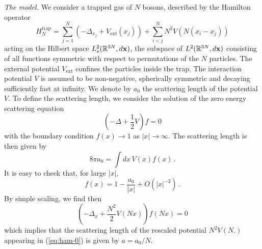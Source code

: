 \documentclass[11pt,a4paper]{article}
\newcommand{\bx}{{\bf x}}
\newcommand{\bR}{{\mathbb R}}
\begin{document}

\bigskip

{\it The model.} We consider a trapped gas of $N$ bosons, described by the Hamilton operator 
\begin{equation}\label{eq:ham-0}
H^{\text{trap}}_N = \sum_{j=1}^N \left(-\Delta_{x_j} +V_{\text{ext}} (x_j)\right) + \sum_{i<j}^N N^2 V (N (x_i - x_j)) 
\end{equation}
acting on the Hilbert space $L^2_s (\bR^{3N}, d\bx)$, the subspace of $L^2 (\bR^{3N}, d\bx)$ consisting of all functions symmetric with respect to permutations of the $N$ particles. The external potential $V_{\text{ext}}$ confines the particles inside the trap. The interaction potential $V$ is assumed to be non-negative, spherically symmetric and decaying sufficiently fast at infinity. We denote by $a_0$ the scattering length of the potential $V$. To define the scattering length, we consider the solution of the zero energy scattering equation 
\begin{equation}\label{eq:0en-0} \left( -\Delta + \frac{1}{2} V \right) f = 0 \end{equation}
with the boundary condition $f (x) \to 1$ as $|x| \to \infty$. The scattering length is then given by 
\begin{equation}\label{eq:8pia} 8 \pi a_0 = \int dx \, V(x) f(x) \, . \end{equation}
It is easy to check that, for large $|x|$, 
\begin{equation}\label{eq:f} f(x) = 1- \frac{a_0}{|x|} + O (|x|^{-2}) \, . \end{equation}
By simple scaling, we find then
\[ \left( -\Delta_x + \frac{N^2}{2} V(N x) \right) f (Nx) = 0 \]
which implies that the scattering length of the rescaled potential $N^2 V(N.)$ appearing in (\ref{eq:ham-0}) is given by $a=a_0/N$. 

\bigskip
\end{document}
